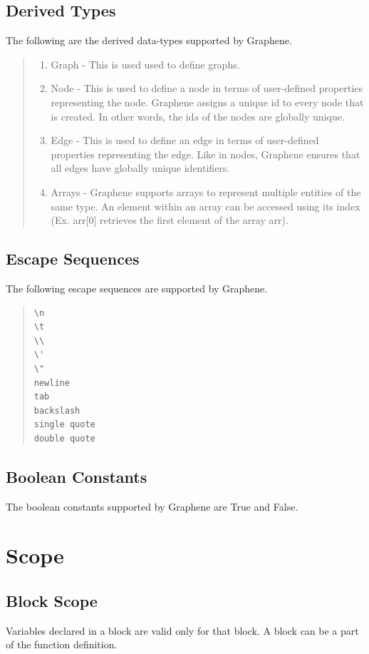 \documentclass[a4paper]{article}
\begin{document}
\begin{large}
\subsection{Derived Types}
The following are the derived data-types supported by Graphene.
\begin{quote}
\begin{enumerate}
\item Graph - This is used used to define graphs.
\item Node - This is used to define a node in terms of user-defined properties representing the node. Graphene assigns a unique id to every node that is created. In other words, the id$s$ of the nodes are globally unique.
\item Edge - This is used to define an edge in terms of user-defined properties representing the edge. Like in nodes, Graphene ensures that all edges have globally unique identifiers. 
\item Arrays - Graphene supports arrays to represent multiple entities of the same type. An element within an array can be accessed using its index (Ex. arr[0] retrieves the first element of the array arr).
\end{enumerate}
\end{quote}

\subsection{Escape Sequences}
The following escape sequences are supported by Graphene.

\begin{multicols}{2}
\begin{quote}
\begin{verbatim}
\n	
\t	
\\	
\'	
\"	
newline
tab
backslash
single quote
double quote
\end{verbatim}
\end{quote}
\end{multicols}

\subsection{Boolean Constants}
The boolean constants supported by Graphene are True and False.

\section{Scope}
\subsection{Block Scope}
Variables declared in a block are valid only for that block. A block can be a part of the function definition.


\end{large}
\end{document}
